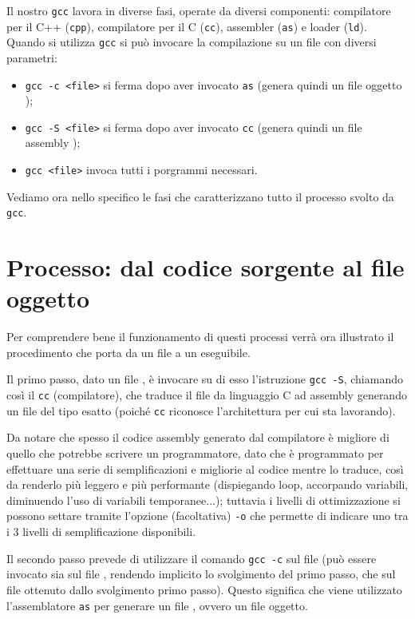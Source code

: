 \documentclass[class=book, crop=false, oneside]{standalone}
\begin{document}
Il nostro \texttt{gcc} lavora in diverse fasi, operate da diversi componenti: compilatore per il C++ (\texttt{cpp}), compilatore per il C (\texttt{cc}), assembler (\texttt{as}) e loader (\texttt{ld}).
Quando si utilizza \texttt{gcc} si può invocare la compilazione su un file con diversi parametri:
\begin{itemize}
	\item \texttt{gcc -c <file>} si ferma dopo aver invocato \texttt{as} (genera quindi un file oggetto );
	\item \texttt{gcc -S <file>} si ferma dopo aver invocato \texttt{cc} (genera quindi un file assembly );
	\item \texttt{gcc <file>} invoca tutti i porgrammi necessari.
\end{itemize}
Vediamo ora nello specifico le fasi che caratterizzano tutto il processo svolto da \texttt{gcc}.

\section{Processo: dal codice sorgente al file oggetto}
Per comprendere bene il funzionamento di questi processi verrà ora illustrato il procedimento che porta da un file  a un eseguibile.

Il primo passo, dato un file , è invocare su di esso l'istruzione \texttt{gcc -S}, chiamando così il \texttt{cc} (compilatore), che traduce il file da linguaggio C ad assembly generando un file  del tipo esatto (poiché \texttt{cc} riconosce l'architettura per cui sta lavorando).

Da notare che spesso il codice assembly generato dal compilatore è migliore di quello che potrebbe scrivere un programmatore, dato che è programmato per effettuare una serie di semplificazioni e migliorie al codice mentre lo traduce, così da renderlo più leggero e più performante (dispiegando loop, accorpando variabili, diminuendo l'uso di variabili temporanee...); tuttavia i livelli di ottimizzazione si possono settare tramite l'opzione (facoltativa) \texttt{-o} che permette di indicare uno tra i \(3\) livelli di semplificazione disponibili.

Il secondo passo prevede di utilizzare il comando \texttt{gcc -c} sul file (può essere invocato sia sul file , rendendo implicito lo svolgimento del primo passo, che sul file  ottenuto dallo svolgimento primo passo). Questo significa che viene utilizzato l'assemblatore \texttt{as} per generare un file , ovvero un file oggetto.
\end{document}

